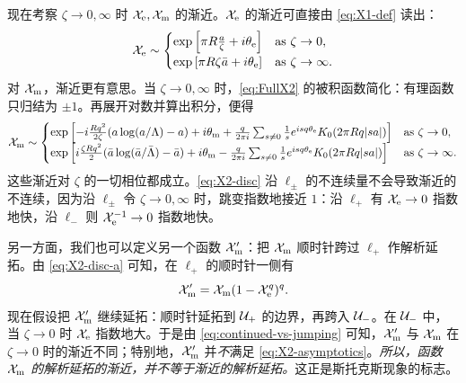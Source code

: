 现在考察 $\zeta \to 0,\infty$ 时 $\mathcal{X}_{\mathrm{e}}, \mathcal{X}_{\mathrm{m}}$ 的渐近。$\mathcal{X}_{\mathrm{e}}$ 的渐近可直接由 \eqref{eq:X1-def} 读出：
\begin{equation} \label{eq:X1-asymptotics}
\mathcal{X}_{\mathrm{e}} \sim \begin{cases}
               \exp \left[ \pi R \frac{a}{\zeta} + i \theta_{\mathrm{e}} \right] & \text{as } \zeta \to 0, \\
               \exp \left[ \pi R \zeta\bar{a} + i \theta_{\mathrm{e}} \right] & \text{as } \zeta \to \infty.
               \end{cases}
\end{equation}
对 $\mathcal{X}_{\mathrm{m}}$，渐近更有意思。当 $\zeta \to 0,\infty$ 时，\eqref{eq:FullX2} 的被积函数简化：有理函数只归结为 $\pm 1$。再展开对数并算出积分，便得
\begin{equation} \label{eq:X2-asymptotics}
\mathcal{X}_{\mathrm{m}} \sim \begin{cases}
               \exp \left[ - i \frac{R q^2}{2\zeta} (a \log (a/\Lambda) - a) + i \theta_{\mathrm{m}} + \frac{q}{2\pi i} \sum_{s \neq 0} \frac{1}{s} e^{i s q \theta_{\mathrm{e}}} K_0(2 \pi R q \lvert sa \rvert) \right] & \text{as } \zeta \to 0, \\
               \exp \left[ i \frac{\zeta R q^2}{2} (\bar{a} \log (\bar{a}/\bar{\Lambda}) - \bar{a}) + i \theta_{\mathrm{m}} - \frac{q}{2\pi i} \sum_{s \neq 0} \frac{1}{s} e^{i s q \theta_{\mathrm{e}}} K_0(2 \pi R q \lvert sa \rvert) \right]  & \text{as } \zeta \to \infty.
               \end{cases}
\end{equation}
这些渐近对 $\zeta$ 的一切相位都成立。\eqref{eq:X2-disc} 沿 $\ell_\pm$ 的不连续量不会导致渐近的不连续，因为沿 $\ell_\pm$ 令 $\zeta \to 0,\infty$ 时，跳变指数地接近 $1$：沿 $\ell_+$ 有 $\mathcal{X}_{\mathrm{e}} \to 0$ 指数地快，沿 $\ell_-$ 则 $\mathcal{X}_{\mathrm{e}}^{-1} \to 0$ 指数地快。

另一方面，我们也可以定义另一个函数 $\mathcal{X}'_{\mathrm{m}}$：把 $\mathcal{X}_{\mathrm{m}}$ 顺时针跨过 $\ell_+$ 作解析延拓。由 \eqref{eq:X2-disc-a} 可知，在 $\ell_+$ 的顺时针一侧有
\begin{equation} \label{eq:continued-vs-jumping}
\mathcal{X}'_{\mathrm{m}} = \mathcal{X}_{\mathrm{m}} (1 - \mathcal{X}_{\mathrm{e}}^q)^{q}.
\end{equation}
现在假设把 $\mathcal{X}'_{\mathrm{m}}$ 继续延拓：顺时针延拓到 $\mathcal{U}_+$ 的边界，再跨入 $\mathcal{U}_-$。在 $\mathcal{U}_-$ 中，当 $\zeta \to 0$ 时 $\mathcal{X}_{\mathrm{e}}$ 指数地大。于是由 \eqref{eq:continued-vs-jumping} 可知，$\mathcal{X}'_{\mathrm{m}}$ 与 $\mathcal{X}_{\mathrm{m}}$ 在 $\zeta \to 0$ 时的渐近不同；特别地，$\mathcal{X}'_{\mathrm{m}}$ 并\emph{不}满足 \eqref{eq:X2-asymptotics}。\emph{所以，函数 $\mathcal{X}_{\mathrm{m}}$ 的解析延拓的渐近，并不等于渐近的解析延拓。}这正是斯托克斯现象的标志。

